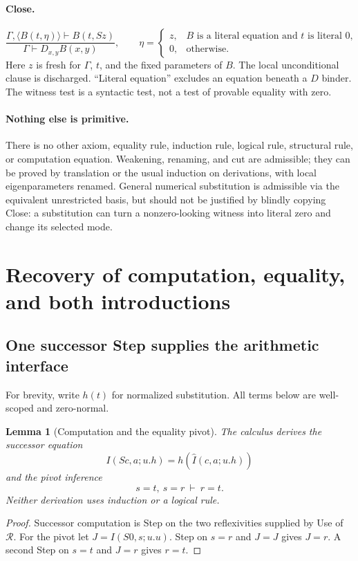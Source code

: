 \documentclass[11pt]{article}
\newtheorem{lemma}[theorem]{Lemma}
\theoremstyle{definition}
\newcommand{\RR}{\mathcal R}
\newcommand{\cl}[1]{\langle #1\rangle}
\begin{document}
\paragraph{Close.}
\[
 \frac{\Gamma,\cl{B(t,\eta)}\vdash B(t,Sz)}
      {\Gamma\vdash D_{x,y}B(x,y)},\qquad
 \eta=
 \begin{cases}
 z,& B\text{ is a literal equation and }t\text{ is literal }0,\\
 0,&\text{otherwise}.
 \end{cases}
 \tag{Close}\label{eq:Close}
\]
Here $z$ is fresh for $\Gamma$, $t$, and the fixed parameters of $B$.
The local unconditional clause is discharged. ``Literal equation'' excludes
an equation beneath a $D$ binder. The witness test is a syntactic test,
not a test of provable equality with zero.

\paragraph{Nothing else is primitive.}
There is no other axiom, equality rule, induction rule, logical rule,
structural rule, or computation equation. Weakening, renaming, and cut are
admissible; they can be proved by translation or the usual induction on
derivations, with local eigenparameters renamed. General numerical
substitution is admissible via the equivalent unrestricted basis, but
should not be justified by blindly copying Close: a substitution can turn
a nonzero-looking witness into literal zero and change its selected mode.

\section{Recovery of computation, equality, and both introductions}
\label{sec:recovery}

\subsection{One successor Step supplies the arithmetic interface}

For brevity, write $h(t)$ for normalized substitution. All terms below are
well-scoped and zero-normal.

\begin{lemma}[Computation and the equality pivot]
\label{lem:pivot}
The calculus derives the successor equation
\[
 I(Sc,a;u.h)=h(\widehat I(c,a;u.h))
\]
and the pivot inference
\[
             s=t,\ s=r\ \vdash\ r=t.
\]
Neither derivation uses induction or a logical rule.
\end{lemma}
\begin{proof}
Successor computation is Step on the two reflexivities supplied by Use of
$\RR$. For the pivot let $J=I(S0,s;u.u)$. Step on $s=r$ and $J=J$ gives
$J=r$. A second Step on $s=t$ and $J=r$ gives $r=t$.
\end{proof}
\end{document}
